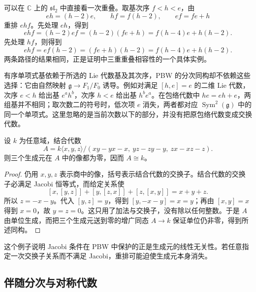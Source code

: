 \ProseParagraphBreak

可以在 \(\mathbb C\) 上的 \(\mathfrak{sl}_2\) 中直接看一次重叠。取基次序 \(f<h<e\)，由
\[
	eh=(h-2)e,\qquad hf=f(h-2),\qquad ef=fe+h
\]
重排 \(ehf\)。先处理 \(eh\)，得到
\[
	ehf=(h-2)ef=(h-2)(fe+h) =f(h-4)e+h(h-2).
\]
先处理 \(hf\)，则得到
\[
	ehf=ef(h-2)=(fe+h)(h-2) =f(h-4)e+h(h-2).
\]
两条路径的结果相同，正是证明中三重重叠相容性的一个具体实例。

\ProseParagraphBreak

有序单项式基依赖于所选的 Lie 代数基及其次序，PBW 的分次同构却不依赖这些选择：它由自然映射 \(\mathfrak g\to F_1/F_0\) 诱导。例如对满足 \([h,e]=e\) 的二维 Lie 代数，次序 \(e<h\) 给出基 \(e^ah^b\)，次序 \(h<e\) 给出基 \(h^be^a\)。在包络代数中 \(he=eh+e\)，两组基并不相同；取次数二的符号时，低次项 \(e\) 消失，两者都对应 \(\operatorname{Sym}^2(\mathfrak g)\) 中的同一个单项式。这里忽略的是当前次数以下的部分，并没有把原包络代数变成交换代数。

\begin{lemma}\label{b5:lem:failed-jacobi-collapse}
	设 \(k\) 为任意域，结合代数
	\[
		A=k\langle x,y,z\rangle/ (xy-yx-x,\ yz-zy-y,\ zx-xz-z).
	\]
	则三个生成元在 \(A\) 中的像都为零，因而 \(A\cong k\)。
\end{lemma}
\begin{proof}
	仍用 \(x,y,z\) 表示商中的像，括号表示结合代数的交换子。结合代数的交换子必满足 Jacobi 恒等式，而给定关系使
	\[
		[x,[y,z]]+[y,[z,x]]+[z,[x,y]]=x+y+z.
	\]
	所以 \(z=-x-y\)。代入 \([y,z]=y\)，得到 \([y,-x-y]=x=y\)；再由 \([x,y]=x\) 得到 \(x=0\)，故 \(y=z=0\)。这只用了加法与交换子，没有除以任何整数。于是 \(A\) 由单位生成，而把三个生成元送到零的增广同态 \(A\to k\) 保证单位仍非零，得到所述同构。
\end{proof}
这个例子说明 Jacobi 条件在 PBW 中保护的正是生成元的线性无关性。若任意指定一次交换子关系而不满足 Jacobi，重排可能迫使生成元本身消失。

\subsection{伴随分次与对称代数}
\label{b5:subsec:1502:03}

